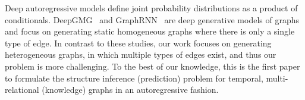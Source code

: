 Deep autoregressive models define joint probability distributions as a product of conditionals. DeepGMG~\citep{li2018learning} and GraphRNN~\citep{you2018graphrnn} are deep generative models of graphs and focus on generating static homogeneous graphs where there is only a single type of edge. In contrast to these studies, our work focuses on generating heterogeneous graphs, in which multiple types of edges exist, and thus our problem is more challenging. 
To the best of our knowledge, this is the first paper to formulate the structure inference (prediction) problem for temporal, multi-relational (knowledge) graphs in an autoregressive fashion. 

